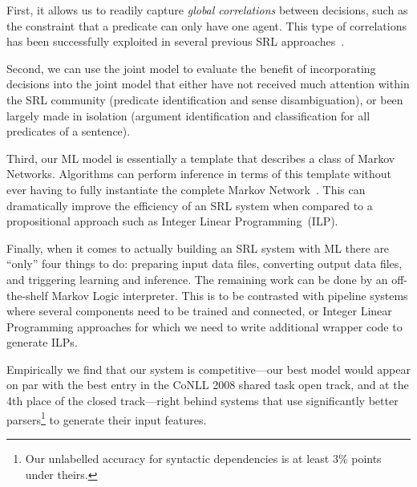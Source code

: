 First, it allows us to readily capture \emph{global correlations}
between decisions, such as the constraint that a predicate can only
have one agent. This type of correlations has been successfully 
exploited in several previous SRL approaches~\citep{toutanova05joint,punyakanok05generalized}. 

Second, we can use the joint model to evaluate the benefit of incorporating
decisions into the joint model that either have not received much
attention within the SRL community (predicate identification and sense
disambiguation), or been largely made in isolation (argument identification and classification for all predicates of a sentence). 

Third, our ML model is essentially a template that describes
a class of Markov Networks.
Algorithms can perform inference in terms of this template without
ever having to fully instantiate the complete Markov
Network~\citep{riedel08improving,singla2008lfo}. This can dramatically improve the efficiency of an SRL system when
compared to a propositional approach such as Integer Linear Programming~(ILP).


Finally, when it comes to actually building an SRL system with ML 
there are ``only''
four things
to do: preparing input data files, converting
output data files, and triggering learning and inference. The remaining
work can be done by an off-the-shelf Markov Logic interpreter. This
is to be contrasted with pipeline systems where several components need
to be trained and connected, or Integer Linear Programming approaches for which we need
to write additional wrapper code to generate ILPs.

Empirically we find that our system is competitive---our best
model would appear on par with the best entry in the CoNLL 2008
shared task open track, and at
the 4th place of the closed track---right behind systems that use
significantly better parsers\footnote{Our unlabelled accuracy for syntactic dependencies is at least 3\% points under theirs.} to generate their input features.

